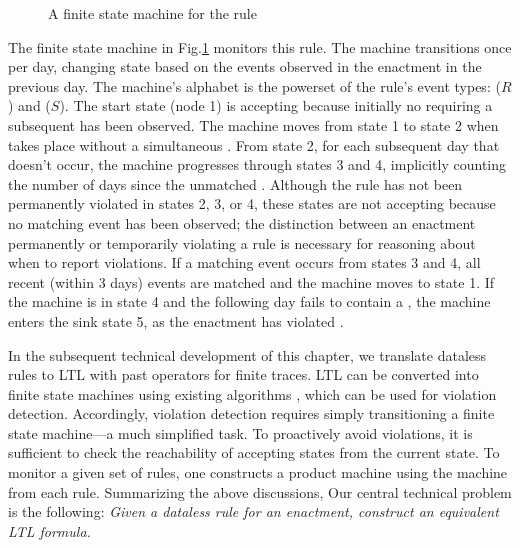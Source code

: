 \begin{examp}
\begin{figure}
\caption{A finite state machine for the {\PromptSchedule} rule}
    \label{fig:promptschedule}
\end{figure}

  The finite state machine
  in Fig.\:\ref{fig:promptschedule}
  monitors this rule.
  The machine transitions once per day,
  changing state based on the events
  observed in the enactment in the previous day.
  The machine's alphabet is the powerset of the rule's event types:
  {\Request} ($R$) and {\Schedule} ($S$).
  The start state (node 1)
  is accepting because initially no {\Request}
  requiring a subsequent {\Schedule} has been observed.
  The machine moves from state 1 to state 2
  when {\Request} takes place
  without a simultaneous {\Schedule}.
  From state 2, for each subsequent day
  that {\Schedule} doesn't occur,
  the machine progresses through
  states 3 and 4,
  implicitly counting the number of days
  since the unmatched {\Request}.
  Although the rule 
  has not been permanently violated
  in states 2, 3, or 4,
  these states are not accepting
  because no matching {\Schedule} event
  has been observed;
  the distinction between an enactment
  permanently or temporarily violating a rule
  is necessary for reasoning about when to report violations.
  If a matching {\Schedule} event
  occurs from states 3 and 4,
  all recent (within 3 days) {\Request} events are matched and
  the machine moves to state 1.
  If the machine is in state 4 and
  the following day fails to contain a {\Schedule},
  the machine enters the sink state 5,
  as the enactment has violated {\PromptSchedule}.
\end{examp}

In the subsequent technical development of this chapter,
we translate dataless rules
to LTL with past operators for finite traces.
LTL can be converted into
finite state machines using existing algorithms
\cite{vardi1986automata,laroussinie2002temporal},
which can be used for violation detection.
Accordingly,
violation detection requires simply transitioning
a finite state machine---a much simplified task.
To proactively avoid violations,
it is sufficient to check the reachability of accepting states
from the current state.
To monitor a given set of rules,
one constructs a product machine using the machine from each rule.
Summarizing the above discussions,
Our central technical problem
is the following:
{\em
Given a dataless rule for an enactment,
construct an equivalent LTL formula.}

